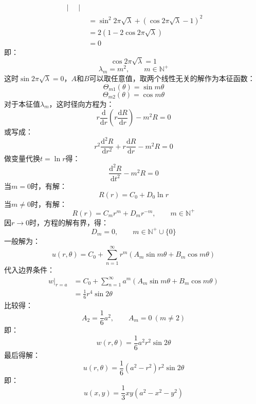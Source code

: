 \documentclass[fontset=windows]{ctexart}
\begin{document}
\begin{itemize}
\begin{align*}
\begin{vmatrix}
        \end{vmatrix} \\
        &= \sin^2{2\pi\sqrt{\lambda}} + \left(\cos2\pi\sqrt{\lambda} - 1\right)^2 \\
        &= 2\left(1 - 2\cos2\pi\sqrt{\lambda}\right) \\
        &= 0
    \end{align*}
    即：
    \[
    \cos2\pi\sqrt{\lambda} = 1
    \]
    \[
    \lambda_m = m^2,\qquad
    m\in\mathbb{N^+}
    \]
    这时$\sin2\pi\sqrt{\lambda} = 0$，$A$和$B$可以取任意值，取两个线性无关的解作为本征函数：
    \[
    \varTheta_{m1}(\theta) = \sin m\theta
    \]
    \[
    \varTheta_{m2}(\theta) = \cos m\theta
    \]
    对于本征值$\lambda_m$，这时径向方程为：
    \[
    r\frac{\mathrm{d}}{\mathrm{d}r}\left(r\frac{\mathrm{d}R}{\mathrm{d} r}\right) - m^2 R = 0
    \]
    或写成：
    \[
    r^2\frac{\mathrm{d}^2 R}{\mathrm{d}r^2} + r\frac{\mathrm{d}R}{\mathrm{d}r} - m^2 R = 0
    \]
    做变量代换$t = \ln r$得：
    \[
    \frac{\mathrm{d}^2 R}{\mathrm{d}t^2} - m^2 R = 0
    \]
    当$m = 0$时，有解：
    \[
    R(r) = C_0 + D_0\ln r
    \]
    当$m \neq 0$时，有解：
    \[
    R(r) = C_m r^m + D_m r^{-m},\qquad
    m \in \mathbb{N^+}
    \]
    因$r\to0$时，方程的解有界，得：
    \[
    D_m = 0,\qquad
    m \in \mathbb{N^+}\cup\{0\}
    \]
    一般解为：
    \[
    u(r,\theta) = C_0 + \sum_{n = 1}^{\infty}r^{m}\left(A_m\sin{m\theta} + B_m\cos{m\theta}\right)
    \]
    代入边界条件：
    \begin{align*}
    \left. w\right|_{r = a}
    &= C_0 + \sum_{n = 1}^{\infty}a^{m}\left(A_m\sin{m\theta} + B_m\cos{m\theta}\right) \\
    &= \frac{1}{6}r^4\sin2\theta
    \end{align*}
    比较得：
    \[
    A_2 = \frac{1}{6}a^2,\qquad A_m = 0\ (m \neq 2)
    \]
    即：
    \[
    w(r,\theta) = \frac{1}{6}a^2 r^2\sin2\theta
    \]
    最后得解：
    \[
    u(r,\theta) = \frac{1}{6}(a^2 - r^2)r^2\sin2\theta
    \]
    即：
    \[
    u(x,y) = \frac{1}{3}xy(a^2 - x^2 - y^2)
    \]
\end{itemize}
\end{document}
